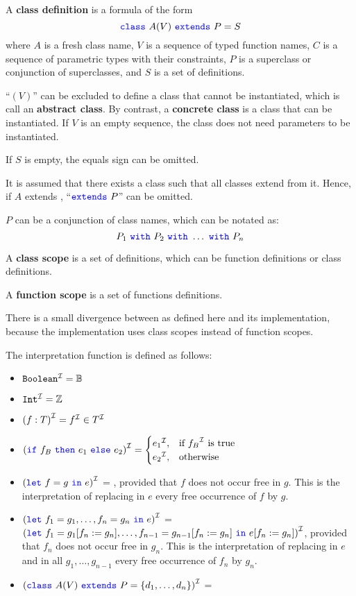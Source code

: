 A \textbf{class definition} is a formula of the form
$${\color{blue}\texttt{{class}}}\ A (V) \ {\color{blue}\texttt{{extends}}}\ P = S$$
where $A$ is a fresh class name, $V$ is a sequence of typed function names, $C$ is a sequence of parametric types with their constraints, $P$ is a superclass or conjunction of superclasses, and $S$ is a set of definitions.

``$(V)$'' can be excluded to define a class that cannot be instantiated, which is call an \textbf{abstract class}.
By contrast, a \textbf{concrete class} is a class that can be instantiated.
If $V$ is an empty sequence, the class does not need parameters to be instantiated.

If $S$ is empty, the equals sign can be omitted.

It is assumed that there exists a class  such that all classes extend from it.
Hence, if $A$ extends , ``${\color{blue}\texttt{{extends}}}\ P$'' can be omitted.

$P$ can be a conjunction of class names, which can be notated as:
$$P_{1} \ \swith\ P_{2} \ \swith\ \ldots \ \swith\ P_{n}$$

A \textbf{class scope} is a set of definitions, which can be function definitions or class definitions.

A \textbf{function scope} is a set of functions definitions.


There is a small divergence between \Soda as defined here and its implementation, because the implementation uses class scopes instead of function scopes.

The interpretation function is defined as follows:
\begin{itemize}
    \item ${\texttt{{Boolean}}}^{\mathcal{I}} = \mathbb{B}$
    \item ${\texttt{{Int}}}^{\mathcal{I}} = \mathbb{Z}$
    \item ${(f : T)}^{\mathcal{I}} = {f}^{\mathcal{I}} \in {T}^{\mathcal{I}}$
    \item $\I{(\sif\ f_{B} \ \sthen\ e_{1} \ \selse\ e_{2})} =
    \begin{cases}
        \I{e_{1}}, & \text{if } \I{f_{B}} \text{ is true }\\
        \I{e_{2}}, & \text{otherwise}
    \end{cases}
    $

    \item ${({\color{blue}\texttt{{let}}}\ f = g \ {\color{blue}\texttt{{in}}}\ e)}^{\mathcal{I}}$ =
    , provided that $f$ does not occur free in $g$.
    This is the interpretation of
    replacing in $e$ every free occurrence of $f$ by $g$.

    \item ${({\color{blue}\texttt{{let}}}\ f_{1} = g_{1}, \ldots , f_{n} = g_{n} \ {\color{blue}\texttt{{in}}}\ e)}^{\mathcal{I}}$ = \\
    ${({\color{blue}\texttt{{let}}}\ f_{1} = g_{1}[f_{n} := g_{n}], \ldots , f_{n - 1} = g_{n - 1}[f_{n} := g_{n}] \ {\color{blue}\texttt{{in}}}\ e[f_{n} := g_{n}])}^{\mathcal{I}}$, provided that $f_{n}$ does not occur free in $g_{n}$.
    This is the interpretation of
    replacing in $e$ and in all $g_{1}, \ldots , g_{n - 1}$ every free occurrence of $f_{n}$ by $g_{n}$.

    \item ${({\color{blue}\texttt{{class}}}\ A (V) \ {\color{blue}\texttt{{extends}}}\ P = \{ d_{1}, \ldots ,d_{n} \})}^{\mathcal{I}}$ =
\end{itemize}


